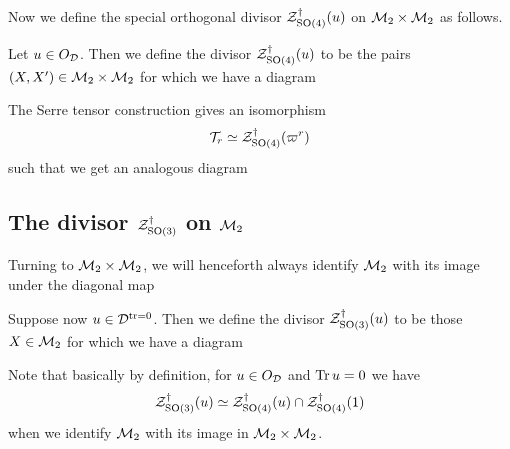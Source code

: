 Now we define the special orthogonal divisor $\mathcal Z^{\dagger}_{\operatorname{SO}(4)}(u)$
on $\mathcal M_2 \times \mathcal M_2$ as follows.
\begin{definition}
  Let $u \in O_\mathcal D$.
  Then we define the divisor $\mathcal Z^{\dagger}_{\operatorname{SO}(4)}(u)$ to be
  the pairs $(X, X') \in \mathcal M_2 \times \mathcal M_2$
  for which we have a diagram
  \begin{center}
  \end{center}
\end{definition}
\begin{conjecture}
  The Serre tensor construction gives an isomorphism
  \[ \mathcal{T}_r \simeq \mathcal Z^{\dagger}_{\operatorname{SO}(4)}(\varpi^r) \]
  such that we get an analogous diagram
  \begin{center}
  \end{center}
\end{conjecture}

\subsection{The divisor $\mathcal Z^{\dagger}_{\operatorname{SO}(3)}$ on $\mathcal M_2$}
Turning to $\mathcal M_2 \times \mathcal M_2$, we will henceforth always identify $\mathcal M_2$
with its image under the diagonal map
\begin{center}
\end{center}

\begin{definition}
  Suppose now $u \in \mathcal D^{\operatorname{tr} = 0}$.
  Then we define the divisor $\mathcal Z^{\dagger}_{\operatorname{SO}(3)}(u)$ to be those $X \in \mathcal M_2$
  for which we have a diagram
  \begin{center}
  \end{center}
  Note that basically by definition, for $u \in O_\mathcal D$ and $\operatorname{Tr} u = 0$ we have
  \[ \mathcal Z^{\dagger}_{\operatorname{SO}(3)}(u) \simeq \mathcal Z^{\dagger}_{\operatorname{SO}(4)}(u) \cap \mathcal Z^{\dagger}_{\operatorname{SO}(4)}(1) \]
  when we identify $\mathcal M_2$ with its image in $\mathcal M_2 \times \mathcal M_2$.
\end{definition}

